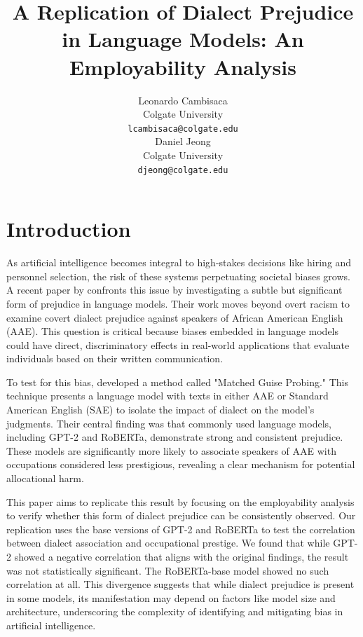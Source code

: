 \documentclass[11pt]{article}
\title{A Replication of Dialect Prejudice in Language Models: An Employability Analysis}
\author{Leonardo Cambisaca \\
  Colgate University \\
  \texttt{lcambisaca@colgate.edu} \\
  \AND 
  Daniel Jeong \\
  Colgate University \\
  \texttt{djeong@colgate.edu} 
}
\begin{document}
\maketitle

\section{Introduction}

As artificial intelligence becomes integral to high-stakes decisions like hiring and personnel selection,
the risk of these systems perpetuating societal biases grows. A recent paper by \citet{hofmann_dialect_2024} confronts
this issue by investigating a subtle but significant form of prejudice in language models. Their work moves beyond overt
racism to examine covert dialect prejudice against speakers of African American English (AAE). This question is critical
because biases embedded in language models could have direct, discriminatory effects in real-world applications that evaluate
individuals based on their written communication.

To test for this bias, \citet{hofmann_dialect_2024} developed a method called "Matched Guise Probing."
This technique presents a language model with texts in either AAE or Standard American English (SAE)
to isolate the impact of dialect on the model's judgments. Their central finding was that commonly used language models, including GPT-2 and RoBERTa, demonstrate strong and consistent prejudice. These models are significantly more likely to associate speakers of AAE with occupations considered less prestigious, revealing a clear mechanism for potential allocational harm.

This paper aims to replicate this result by focusing on the employability
analysis to verify whether this form of dialect prejudice can be consistently observed.
Our replication uses the base versions of GPT-2 \citep{radford2019language} and RoBERTa \citep{DBLP:journals/corr/abs-1907-11692} to test the correlation between dialect association and occupational prestige. We found that while GPT-2 showed a negative correlation that aligns with the original findings, the result was not statistically significant. The RoBERTa-base model showed no such correlation at all. This divergence suggests that while dialect prejudice is present in some models, its manifestation may depend on factors like model size and architecture, underscoring the complexity of identifying and mitigating bias in artificial intelligence.
\end{document}
